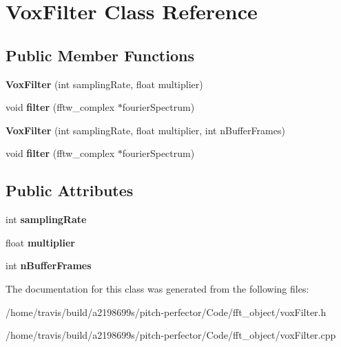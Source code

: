 \hypertarget{classVoxFilter}{\section{Vox\-Filter Class Reference}
\label{classVoxFilter}
}
\subsection*{Public Member Functions}
\begin{DoxyCompactItemize}
\item 
\hypertarget{classVoxFilter_ae0916e10079f346f17ab01a1a9ed55ff}{{\bfseries Vox\-Filter} (int sampling\-Rate, float multiplier)}\label{classVoxFilter_ae0916e10079f346f17ab01a1a9ed55ff}

\item 
\hypertarget{classVoxFilter_affb06db2db581c453d6c233e4e99348c}{void {\bfseries filter} (fftw\-\_\-complex $\ast$fourier\-Spectrum)}\label{classVoxFilter_affb06db2db581c453d6c233e4e99348c}

\item 
\hypertarget{classVoxFilter_a65866f74c95e3b5a9335a0f85c6ba49f}{{\bfseries Vox\-Filter} (int sampling\-Rate, float multiplier, int n\-Buffer\-Frames)}\label{classVoxFilter_a65866f74c95e3b5a9335a0f85c6ba49f}

\item 
\hypertarget{classVoxFilter_affb06db2db581c453d6c233e4e99348c}{void {\bfseries filter} (fftw\-\_\-complex $\ast$fourier\-Spectrum)}\label{classVoxFilter_affb06db2db581c453d6c233e4e99348c}

\end{DoxyCompactItemize}
\subsection*{Public Attributes}
\begin{DoxyCompactItemize}
\item 
\hypertarget{classVoxFilter_a1700ccea93b06ad54b705c3f0e72d5df}{int {\bfseries sampling\-Rate}}\label{classVoxFilter_a1700ccea93b06ad54b705c3f0e72d5df}

\item 
\hypertarget{classVoxFilter_a3001e05ab9d310b7dce2029d3abfa9cd}{float {\bfseries multiplier}}\label{classVoxFilter_a3001e05ab9d310b7dce2029d3abfa9cd}

\item 
\hypertarget{classVoxFilter_a6d754fbf19d71a7932c67a4642dff480}{int {\bfseries n\-Buffer\-Frames}}\label{classVoxFilter_a6d754fbf19d71a7932c67a4642dff480}

\end{DoxyCompactItemize}


The documentation for this class was generated from the following files\-:\begin{DoxyCompactItemize}
\item 
/home/travis/build/a2198699s/pitch-\/perfector/\-Code/fft\-\_\-object/vox\-Filter.\-h\item 
/home/travis/build/a2198699s/pitch-\/perfector/\-Code/fft\-\_\-object/vox\-Filter.\-cpp\end{DoxyCompactItemize}

